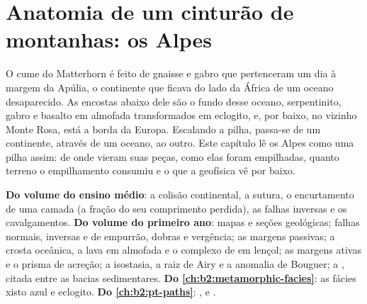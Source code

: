 \chapter{Anatomia de um cinturão de montanhas: os Alpes}\label{ch:b2:alpine-orogen}

O cume do Matterhorn é feito de gnaisse e gabro que pertenceram um dia à margem
da Apúlia, o continente que ficava do lado da África de um oceano desaparecido. As encostas abaixo
dele são o fundo desse oceano, serpentinito, gabro e basalto em almofada transformados em eclogito, e,
por baixo, no vizinho Monte Rosa, está a borda da Europa. Escalando a
pilha, passa-se de um continente, através de um oceano, ao outro. Este capítulo lê os Alpes como uma pilha assim: de onde vieram suas peças, como elas foram
empilhadas, quanto terreno o empilhamento consumiu e o que a geofísica vê por baixo.

\begin{recall}
\textbf{Do volume do ensino médio}: a colisão continental, a sutura, o encurtamento de uma
camada (a fração do seu comprimento perdida), as falhas inversas e os cavalgamentos. \textbf{Do volume do primeiro
ano}: mapas e seções geológicas; falhas normais, inversas e de empurrão, dobras e
vergência; as margens passivas; a crosta oceânica, a lava em almofada e o complexo de  em lençol;
as margens ativas e o prisma de acreção; a isostasia, a raiz de Airy e a anomalia de Bouguer;
a , citada entre as bacias sedimentares. \textbf{Do
\cref{ch:b2:metamorphic-facies}}: as fácies xisto azul e eclogito. \textbf{Do
\cref{ch:b2:pt-paths}}: ,  e .
\end{recall}

